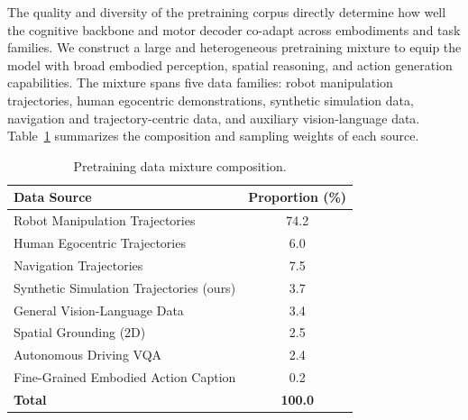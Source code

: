 \label{sec:data}

The quality and diversity of the pretraining corpus directly determine how well
the cognitive backbone and motor decoder co-adapt across embodiments and task
families.
We construct a large and heterogeneous pretraining mixture to equip the model
with broad embodied perception, spatial reasoning, and action generation
capabilities.
The mixture spans five data families: robot manipulation trajectories, human
egocentric demonstrations, synthetic simulation data, navigation and
trajectory-centric data, and auxiliary vision-language data.
Table~\ref{tab:data} summarizes the composition and sampling weights of each
source.

\begin{table}[h]
\centering
\caption{Pretraining data mixture composition.}
\label{tab:data}
\begin{tabular}{lc}
\toprule
\textbf{Data Source} & \textbf{Proportion (\%)} \\
\midrule
Robot Manipulation Trajectories      & 74.2 \\
Human Egocentric Trajectories                & 6.0  \\
Navigation Trajectories                     & 7.5  \\
Synthetic Simulation Trajectories (ours)            & 3.7  \\
General Vision-Language Data         & 3.4  \\
Spatial Grounding (2D)               & 2.5  \\
Autonomous Driving VQA               & 2.4  \\
Fine-Grained Embodied Action Caption & 0.2  \\
\midrule
\textbf{Total}                       & \textbf{100.0} \\
\bottomrule
\end{tabular}
\end{table}



